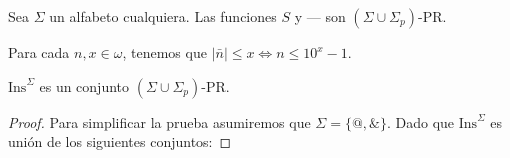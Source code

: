   \begin{lemma}
    \PN Sea $\Sigma$ un alfabeto cualquiera. Las funciones $S$ y \---- son $(\Sigma \cup \Sigma_{p})$-PR.
  \end{lemma}

  \begin{lemma}
    \PN Para cada $n, x \in \omega$, tenemos que $\lvert \bar{n} \rvert \leq x \Leftrightarrow n \leq 10^{x}-1$.
  \end{lemma}

  \begin{lemma}
    \PN $\mathrm{Ins}^{\Sigma}$ es un conjunto $(\Sigma \cup \Sigma_{p})$-PR.
  \end{lemma}
  \begin{proof}
    \PN Para simplificar la prueba asumiremos que $\Sigma =\{@,\&\}$. Dado que $\mathrm{Ins}^{\Sigma}$ es unión de los
    siguientes conjuntos:


\end{proof}
